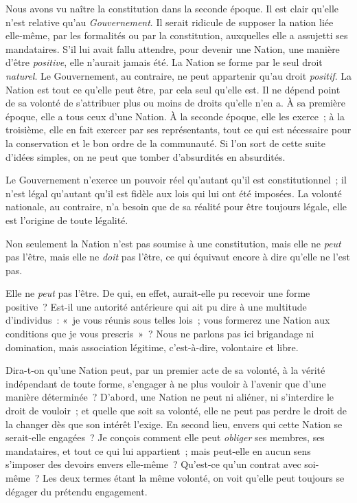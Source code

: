 \documentclass[french,twoside]{book} %
\begin{document}
Nous avons vu naître la constitution dans la seconde époque. Il est clair qu’elle n’est relative qu’au {\itshape Gouvernement}. Il serait ridicule de supposer la nation liée elle-même, par les formalités ou par la constitution, auxquelles elle a assujetti ses mandataires. S’il lui avait fallu attendre, pour devenir une Nation, une manière d’être {\itshape positive}, elle n’aurait jamais été. La Nation se forme par le seul droit {\itshape naturel}. Le Gouvernement, au contraire, ne peut appartenir qu’au droit {\itshape positif}. La Nation est tout ce qu’elle peut être, par cela seul qu’elle est. Il ne dépend point de sa volonté de s’attribuer plus ou moins de droits qu’elle n’en a. À sa première époque, elle a tous ceux d’une Nation. À la seconde époque, elle les exerce ; à la troisième, elle en fait exercer par ses représentants, tout ce qui est nécessaire pour la conservation et le bon ordre de la communauté. Si l’on sort de cette suite d’idées simples, on ne peut que tomber d’absurdités en absurdités.\par
Le Gouvernement n’exerce un pouvoir réel qu’autant qu’il est constitutionnel ; il n’est légal qu’autant qu’il est fidèle aux lois qui lui ont été imposées. La volonté nationale, au contraire, n’a besoin que de sa réalité pour être toujours légale, elle est l’origine de toute légalité.\par
Non seulement la Nation n’est pas soumise à une constitution, mais elle ne {\itshape peut} pas l’être, mais elle ne {\itshape doit} pas l’être, ce qui équivaut encore à dire qu’elle ne l’est pas.\par
Elle ne {\itshape peut} pas l’être. De qui, en effet, aurait-elle pu recevoir une forme positive ? Est-il une autorité antérieure qui ait pu dire à une multitude d’individus : « je vous réunis sous telles lois ; vous formerez une Nation aux conditions que je vous prescris » ? Nous ne parlons pas ici brigandage ni domination, mais association légitime, c’est-à-dire, volontaire et libre.\par
Dira-t-on qu’une Nation peut, par un premier acte de sa volonté, à la vérité indépendant de toute forme, s’engager à ne plus vouloir à l’avenir que d’une manière déterminée ? D’abord, une Nation ne peut ni aliéner, ni s’interdire le droit de vouloir ; et quelle que soit sa volonté, elle ne peut pas perdre le droit de la changer dès que son intérêt l’exige. En second lieu, envers qui cette Nation se serait-elle engagées ? Je conçois comment elle peut {\itshape obliger} ses membres, ses mandataires, et tout ce qui lui appartient ; mais peut-elle en aucun sens s’imposer des devoirs envers elle-même ? Qu’est-ce qu’un contrat avec soi-même ? Les deux termes étant la même volonté, on voit qu’elle peut toujours se dégager du prétendu engagement.\par
\end{document}
